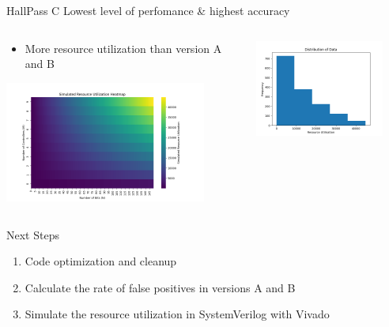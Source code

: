 \begin{frame}{HallPass C}
    Lowest level of perfomance \& highest accuracy 
    \begin{columns}
        \begin{column}{0.5\textwidth}
            \begin{itemize}
                \item More resource utilization than version A and B
            \end{itemize}
            \centering
            \includegraphics[height=0.85\textheight,width=0.85\textwidth,keepaspectratio]{images/10x10 heatmap HP_C.png}
        \end{column}
        \begin{column}{0.6\textwidth}
            \centering
            \includegraphics[height=0.85\textheight,width=0.85\textwidth,keepaspectratio]{images/10x10 histogram HP_C.png}
        \end{column}
    \end{columns}            
\end{frame}

\begin{frame}{Next Steps}
    \begin{enumerate}
        \item Code optimization and cleanup
        \item Calculate the rate of false positives in versions A and B
        \item Simulate the resource utilization in SystemVerilog with Vivado
    \end{enumerate}
\end{frame}